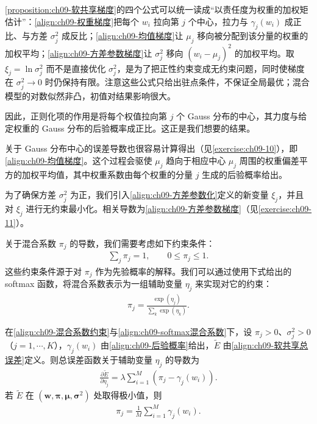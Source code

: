 \documentclass[../../main.tex]{subfiles}
\begin{document}
\begin{remark}\cref{proposition:ch09-软共享梯度}的四个公式可以统一读成“以责任度为权重的加权矩估计”：\eqref{align:ch09-权重梯度}把每个 $w_{i}$ 拉向第 $j$ 个中心，拉力与 $\gamma_{j}(w_{i})$ 成正比、与方差 $\sigma_{j}^{2}$ 成反比；\eqref{align:ch09-均值梯度}让 $\mu_{j}$ 移向被分配到该分量的权重的加权平均；\eqref{align:ch09-方差参数梯度}让 $\sigma_{j}^{2}$ 移向 $(w_{i}-\mu_{j})^{2}$ 的加权平均。取 $\xi_{j}=\ln\sigma_{j}^{2}$ 而不是直接优化 $\sigma_{j}^{2}$，是为了把正性约束变成无约束问题，同时使梯度在 $\sigma_{j}^{2}\to0$ 时仍保持有限。注意这些公式只给出驻点条件，不保证全局最优；混合模型的对数似然非凸，初值对结果影响很大。
\end{remark}

因此，正则化项的作用是将每个权值拉向第 $j$ 个 Gauss 分布的中心，其力度与给定权重的 Gauss 分布的后验概率成正比。这正是我们想要的结果。

关于 Gauss 分布中心的误差导数也很容易计算得出（见\cref{exercise:ch09-10}），即\eqref{align:ch09-均值梯度}。这个过程会驱使 $\mu_{j}$ 趋向于相应中心 $\mu_{j}$ 周围的权重偏差平方的加权平均值，其中权重系数由每个权重的分量 $j$ 生成的后验概率给出。

为了确保方差 $\sigma_{j}^{2}$ 为正，我们引入\eqref{align:ch09-方差参数化}定义的新变量 $\xi_{j}$，并且对 $\xi_{j}$ 进行无约束最小化。相关导数为\eqref{align:ch09-方差参数梯度}（见\cref{exercise:ch09-11}）。

关于混合系数 $\pi_{j}$ 的导数，我们需要考虑如下约束条件：
\begin{align}
\sum_{j}\pi_{j}=1,\qquad 0\leqslant\pi_{j}\leqslant1.
\label{align:ch09-混合系数约束}
\end{align}
这些约束条件源于对 $\pi_{j}$ 作为先验概率的解释。我们可以通过使用下式给出的 softmax 函数，将混合系数表示为一组辅助变量 $\eta_{j}$ 来实现对它的约束：
\begin{align}
\pi_{j}=\frac{\exp(\eta_{j})}{\sum_{k}\exp(\eta_{k})}.
\label{align:ch09-softmax混合系数}
\end{align}

\begin{proposition}[混合系数的梯度]\label{proposition:ch09-混合系数梯度}
在\eqref{align:ch09-混合系数约束}与\eqref{align:ch09-softmax混合系数}下，设 $\pi_{j}>0$、$\sigma_{j}^{2}>0$（$j=1,\cdots,K$），$\gamma_{j}(w_{i})$ 由\eqref{align:ch09-后验概率}给出，$\widetilde{E}$ 由\eqref{align:ch09-软共享总误差}定义。则总误差函数关于辅助变量 $\eta_{j}$ 的导数为
\begin{align}
\frac{\partial\widetilde{E}}{\partial\eta_{j}}=\lambda\sum_{i=1}^{M}\left(\pi_{j}-\gamma_{j}(w_{i})\right).
\label{align:ch09-混合系数梯度}
\end{align}
若 $\widetilde{E}$ 在 $(\boldsymbol{w},\boldsymbol{\pi},\boldsymbol{\mu},\boldsymbol{\sigma}^{2})$ 处取得极小值，则
\begin{align*}
\pi_{j}=\frac{1}{M}\sum_{i=1}^{M}\gamma_{j}(w_{i}).
\end{align*}
\end{proposition}
\end{document}
